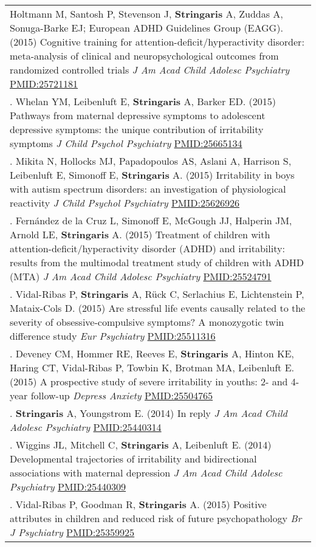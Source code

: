 \documentclass[
]{article}
\begin{document}
\begin{longtable}[]{@{}
  >{\raggedright\arraybackslash}p{}@{}}
Holtmann M, Santosh P, Stevenson J, \textbf{Stringaris} A, Zuddas A,
Sonuga-Barke EJ; European ADHD Guidelines Group (EAGG). (2015) Cognitive
training for attention-deficit/hyperactivity disorder: meta-analysis of
clinical and neuropsychological outcomes from randomized controlled
trials \emph{J Am Acad Child Adolesc Psychiatry} \url{PMID:25721181} \\
138. Whelan YM, Leibenluft E, \textbf{Stringaris} A, Barker ED. (2015)
Pathways from maternal depressive symptoms to adolescent depressive
symptoms: the unique contribution of irritability symptoms \emph{J Child
Psychol Psychiatry} \url{PMID:25665134} \\
139. Mikita N, Hollocks MJ, Papadopoulos AS, Aslani A, Harrison S,
Leibenluft E, Simonoff E, \textbf{Stringaris} A. (2015) Irritability in
boys with autism spectrum disorders: an investigation of physiological
reactivity \emph{J Child Psychol Psychiatry} \url{PMID:25626926} \\
140. Fernández de la Cruz L, Simonoff E, McGough JJ, Halperin JM, Arnold
LE, \textbf{Stringaris} A. (2015) Treatment of children with
attention-deficit/hyperactivity disorder (ADHD) and irritability:
results from the multimodal treatment study of children with ADHD (MTA)
\emph{J Am Acad Child Adolesc Psychiatry} \url{PMID:25524791} \\
141. Vidal-Ribas P, \textbf{Stringaris} A, Rück C, Serlachius E,
Lichtenstein P, Mataix-Cols D. (2015) Are stressful life events causally
related to the severity of obsessive-compulsive symptoms? A monozygotic
twin difference study \emph{Eur Psychiatry} \url{PMID:25511316} \\
142. Deveney CM, Hommer RE, Reeves E, \textbf{Stringaris} A, Hinton KE,
Haring CT, Vidal-Ribas P, Towbin K, Brotman MA, Leibenluft E. (2015) A
prospective study of severe irritability in youths: 2- and 4-year
follow-up \emph{Depress Anxiety} \url{PMID:25504765} \\
143. \textbf{Stringaris} A, Youngstrom E. (2014) In reply \emph{J Am
Acad Child Adolesc Psychiatry} \url{PMID:25440314} \\
144. Wiggins JL, Mitchell C, \textbf{Stringaris} A, Leibenluft E. (2014)
Developmental trajectories of irritability and bidirectional
associations with maternal depression \emph{J Am Acad Child Adolesc
Psychiatry} \url{PMID:25440309} \\
145. Vidal-Ribas P, Goodman R, \textbf{Stringaris} A. (2015) Positive
attributes in children and reduced risk of future psychopathology
\emph{Br J Psychiatry} \url{PMID:25359925} \\

\end{longtable}
\end{document}
